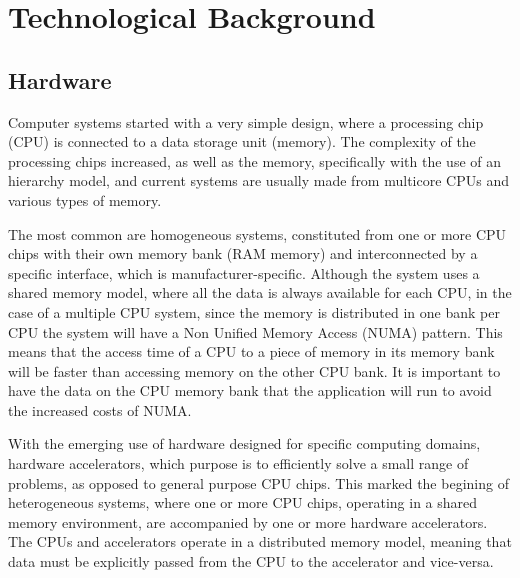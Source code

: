 \chapter{Technological Background}
\label{TechnologicalBackground}

\section{Hardware}
\label{Hardware}

Computer systems started with a very simple design, where a processing chip (CPU) is connected to a data storage unit (memory). The complexity of the processing chips increased, as well as the memory, specifically with the use of an hierarchy model, and current systems are usually made from multicore CPUs and various types of memory.

The most common are homogeneous systems, constituted from one or more CPU chips with their own memory bank (RAM memory) and interconnected by a specific interface, which is manufacturer-specific. Although the system uses a shared memory model, where all the data is always available for each CPU, in the case of a multiple CPU system, since the memory is distributed in one bank per CPU the system will have a Non Unified Memory Access (NUMA) pattern. This means that the access time of a CPU to a piece of memory in its memory bank will be faster than accessing memory on the other CPU bank. It is important to have the data on the CPU memory bank that the application will run to avoid the increased costs of NUMA.

With the emerging use of hardware designed for specific computing domains, hardware accelerators, which purpose is to efficiently solve a small range of problems, as opposed to general purpose CPU chips. This marked the begining of heterogeneous systems, where one or more CPU chips, operating in a shared memory environment, are accompanied by one or more hardware accelerators. The CPUs and accelerators operate in a distributed memory model, meaning that data must be explicitly passed from the CPU to the accelerator and vice-versa.

